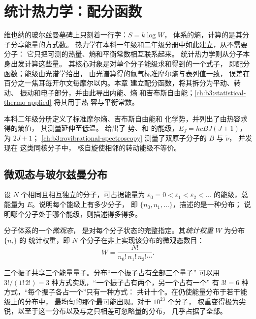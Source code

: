 \chapter{统计热力学：配分函数}\label{ch:b3:partition-functions}

维也纳的玻尔兹曼墓碑上只刻着一行字：$S = k\log W$，
体系的熵，计算的是其分子分享能量的方式数。
热力学在本科一年级和二年级分册中如此建立，从不需要分子：
它只把可测的热量、熵和平衡常数相互联系起来。
统计热力学则从分子本身出发计算这些量。
其核心对象是对单个分子能级求和得到的一个式子，
即配分函数；能级由光谱学给出，
由光谱算得的氮气标准摩尔熵与表列值一致，
误差在百分之一焦耳每开尔文每摩尔以内。本章
建立配分函数，将其拆分为平动、转动、
振动和电子部分，并由此导出内能、熵
和吉布斯自由能；\cref{ch:b3:statistical-thermo-applied} 将其用于热
容与平衡常数。

\begin{recall}
本科二年级分册定义了标准摩尔熵、吉布斯自由能和
化学势，并列出了由热容求得的熵值，
其测量延伸至低温。 给出了
势、和
的能级，$E_J = hcBJ(J+1)$，为 $2J + 1$；
\cref{ch:b3:rovibrational-spectroscopy} 测量了双原子分子的 $B$ 与 $\tilde\nu$，
并发现在  这类同核分子中，
核自旋使相邻的转动能级不等价。
\end{recall}

\section{微观态与玻尔兹曼分布}

设 $N$ 个相同且相互独立的分子，可占据能量为
$\varepsilon_0 = 0 < \varepsilon_1 < \varepsilon_2 < \dots$ 的能级，总能量为 $E$。说明每个能级上有多少分子，
即 $\{n_0, n_1, \dots\}$，描述的是一种分布；
说明哪个分子处于哪个能级，则描述得多得多。

\begin{definition}\label{def:b3:partition-functions:microstate}
分子体系的一个\emph{微观态}，
是对每个分子状态的完整指定。其\emph{统计权重}
$W$ 为分布 $\{n_i\}$ 的
统计权重，即 $N$ 个分子在非上实现该分布的微观态数目：
\[
  W = \frac{N!}{n_0!\,n_1!\,n_2!\cdots}.
\]
\end{definition}

\begin{example}[三个振子共享三个量子]\label{ex:b3:partition-functions:three-quanta}
三个振子共享三个能量量子。分布“一个振子占有全部三个量子”
可以用 $3!/(1!\,2!) = 3$ 种方式实现，“一个振子占有两个，另一个占有一个”
有 $3! = 6$ 种方式，“每个振子各占一个”只有一种方式：
共计十个。在仍使能量分布于若干能级上的分布中，
最均匀的那个最可能出现。对于 $10^{23}$ 个分子，
权重变得极为尖锐，以至于这一分布以及与之只相差可忽略量的分布，
几乎占据了全部。
\end{example}

